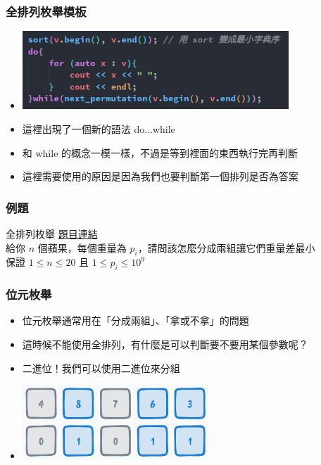 \documentclass{beamer}
\begin{document}
\begin{frame}
    \frametitle{全排列枚舉模板}
    \begin{itemize}
        \item \includegraphics[width=10.0cm]{img/img_2.png}
        \item 這裡出現了一個新的語法 do...while
        \item 和 while 的概念一模一樣，不過是等到裡面的東西執行完再判斷
        \item 這裡需要使用的原因是因為我們也要判斷第一個排列是否為答案
    \end{itemize}
\end{frame}

\begin{frame}
    \frametitle{例題}
    \begin{block}{全排列枚舉}
        \href{https://cses.fi/problemset/task/1623}{題目連結}\\
        給你 $n$ 個蘋果，每個重量為 $p_i$，請問該怎麼分成兩組讓它們重量差最小\\
        保證 $1 \leq n \leq 20$ 且 $1 \leq p_i \leq 10^9$
    \end{block}
\end{frame}

\begin{frame}
    \frametitle{位元枚舉}
    \begin{itemize}
        \item 位元枚舉通常用在「分成兩組」、「拿或不拿」的問題
        \item 這時候不能使用全排列，有什麼是可以判斷要不要用某個參數呢？
        \vspace{0.5cm}
        \item<2-> 二進位！我們可以使用二進位來分組
        \item<2-> \includegraphics[width=7.0cm]{img/img_3.png}
    \end{itemize}
\end{frame}
\end{document}
